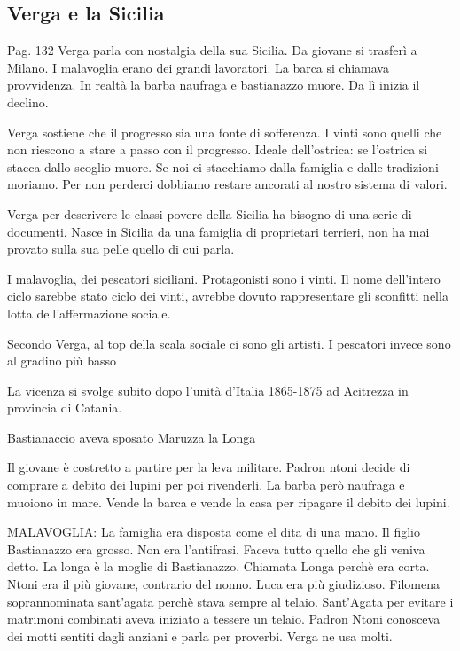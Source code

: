 \documentclass{article}
\begin{document}
    \subsection{Verga e la Sicilia}
    Pag. 132
    Verga parla con nostalgia della sua Sicilia. Da giovane si trasferì a Milano.
    I malavoglia erano dei grandi lavoratori.
    La barca si chiamava provvidenza. In realtà la barba naufraga e bastianazzo muore. Da lì inizia il declino.

    Verga sostiene che il progresso sia una fonte di sofferenza. I vinti sono quelli che non riescono a stare a passo con il progresso.
    Ideale dell'ostrica: se l'ostrica si stacca dallo scoglio muore. Se noi ci stacchiamo dalla famiglia e dalle tradizioni moriamo. Per non perderci dobbiamo restare ancorati al nostro sistema di valori.

    Verga per descrivere le classi povere della Sicilia ha bisogno di una serie di documenti. Nasce in Sicilia da una famiglia di proprietari terrieri, non ha mai provato sulla sua pelle quello di cui parla.

    I malavoglia, dei pescatori siciliani. Protagonisti sono i vinti. Il nome dell'intero ciclo sarebbe stato ciclo dei vinti, avrebbe dovuto rappresentare gli sconfitti nella lotta dell'affermazione sociale.

    Secondo Verga, al top della scala sociale ci sono gli artisti. I pescatori invece sono al gradino più basso

    La vicenza si svolge subito dopo l'unità d'Italia 1865-1875 ad Acitrezza in provincia di Catania. 

    Bastianaccio aveva sposato Maruzza la Longa

    Il giovane è costretto a partire per la leva militare. Padron ntoni decide di comprare a debito dei lupini per poi rivenderli. La barba però naufraga e muoiono in mare. Vende la barca e vende la casa per ripagare il debito dei lupini.

    MALAVOGLIA: La famiglia era disposta come el dita di una mano. 
    Il figlio Bastianazzo era grosso. Non era l'antifrasi. Faceva tutto quello che gli veniva detto.
    La longa è la moglie di Bastianazzo. Chiamata Longa perchè era corta.
    Ntoni era il più giovane, contrario del nonno.
    Luca era più giudizioso.
    Filomena soprannominata sant'agata perchè stava sempre al telaio. Sant'Agata per evitare i matrimoni combinati aveva iniziato a tessere un telaio.
    Padron Ntoni conosceva dei motti sentiti dagli anziani e parla per proverbi. Verga ne usa molti.
\end{document}
